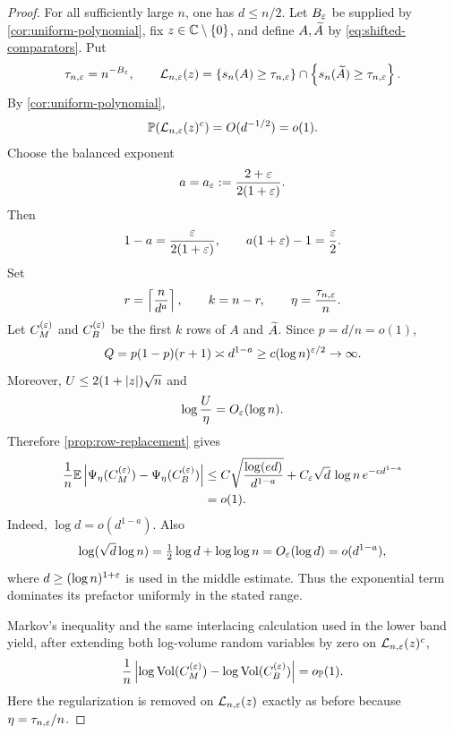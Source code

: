 \begin{proof}
For all sufficiently large $n$, one has $d\le n/2$. Let $B_\varepsilon$ be supplied by \cref{cor:uniform-polynomial}, fix $z\in\mathbb C\setminus\left\{0\right\}$, and define $A,\widetilde A$ by \eqref{eq:shifted-comparators}. Put
\[
  \tau_{n,\varepsilon}=n^{-B_\varepsilon},
  \qquad
  \mathcal L_{n,\varepsilon}(z)
  =\left\{s_n(A)\ge\tau_{n,\varepsilon}\right\}
  \cap\left\{s_n(\widetilde A)\ge\tau_{n,\varepsilon}\right\}.
\]
By \cref{cor:uniform-polynomial},
\begin{equation}\label{eq:superlog-good-event}
  \mathbb P(\mathcal L_{n,\varepsilon}(z)^c)=O(d^{-1/2})=o(1).
\end{equation}
Choose the balanced exponent
\begin{equation}\label{eq:balanced-a}
  a=a_\varepsilon:=\frac{2+\varepsilon}{2(1+\varepsilon)}.
\end{equation}
Then
\begin{equation}\label{eq:a-identities}
  1-a=\frac{\varepsilon}{2(1+\varepsilon)},
  \qquad
  a(1+\varepsilon)-1=\frac{\varepsilon}2.
\end{equation}
Set
\begin{equation}\label{eq:superlog-prefix-parameters}
  r=\left\lceil \frac n{d^a}\right\rceil,
  \qquad
  k=n-r,
  \qquad
  \eta=\frac{\tau_{n,\varepsilon}}n.
\end{equation}
Let $C_M^{(\varepsilon)}$ and $C_B^{(\varepsilon)}$ be the first $k$ rows of $A$ and $\widetilde A$. Since $p=d/n=o(1)$,
\begin{equation}\label{eq:superlog-Q}
  Q=p(1-p)(r+1)\asymp d^{1-a}
  \ge c(\log n)^{\varepsilon/2}\to\infty.
\end{equation}
Moreover, $U\le2(1+\left|z\right|)\sqrt n$ and
\[
  \log\frac U\eta=O_\varepsilon(\log n).
\]
Therefore \cref{prop:row-replacement} gives
\begin{align}
  \frac1n\mathbb E\left|
    \Psi_\eta(C_M^{(\varepsilon)})-\Psi_\eta(C_B^{(\varepsilon)})
  \right|
  &\le C\sqrt{\frac{\log(ed)}{d^{1-a}}}
  +C_\varepsilon\sqrt d\,\log n\,e^{-cd^{1-a}}
  \notag\\
  &=o(1).
  \label{eq:superlog-replacement}
\end{align}
Indeed, $\log d=o(d^{1-a})$. Also
\[
  \log(\sqrt d\log n)=\tfrac12\log d+\log\log n
  =O_\varepsilon(\log d)=o(d^{1-a}),
\]
where $d\ge(\log n)^{1+\varepsilon}$ is used in the middle estimate. Thus the exponential term dominates its prefactor uniformly in the stated range.

Markov's inequality and the same interlacing calculation used in the lower band yield, after extending both log-volume random variables by zero on $\mathcal L_{n,\varepsilon}(z)^c$,
\begin{equation}\label{eq:superlog-prefix-volume}
  \frac1n\left|
    \log\operatorname{Vol}(C_M^{(\varepsilon)})-\log\operatorname{Vol}(C_B^{(\varepsilon)})
  \right|=o_{\mathbb P}(1).
\end{equation}
Here the regularization is removed on $\mathcal L_{n,\varepsilon}(z)$ exactly as before because $\eta=\tau_{n,\varepsilon}/n$.


\end{proof}
